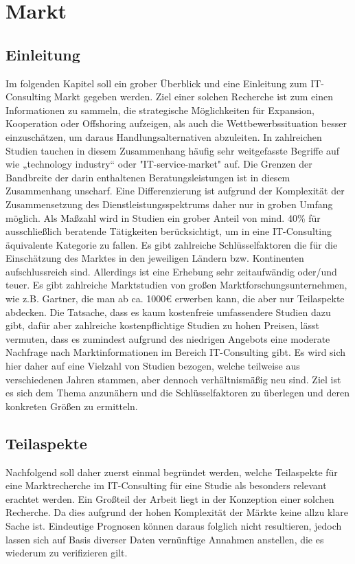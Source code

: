 \section{Markt}
\subsection{Einleitung}
Im folgenden Kapitel soll ein grober Überblick und eine Einleitung zum IT-Consulting Markt gegeben werden. 
Ziel einer solchen Recherche ist zum einen Informationen zu sammeln, die strategische Möglichkeiten für Expansion, Kooperation oder Offshoring aufzeigen, 
als auch die Wettbewerbssituation besser einzuschätzen, um daraus Handlungsalternativen abzuleiten. 
In zahlreichen Studien tauchen in diesem Zusammenhang häufig sehr weitgefasste Begriffe auf wie „technology industry“ oder "IT-service-market" auf. 
Die Grenzen der Bandbreite der darin enthaltenen Beratungsleistungen ist in diesem Zusammenhang unscharf. Eine Differenzierung ist aufgrund der Komplexität der Zusammensetzung des Dienstleistungsspektrums daher nur in groben Umfang möglich.
Als Maßzahl wird in Studien ein grober Anteil von mind. 40\% für ausschließlich beratende Tätigkeiten berücksichtigt, um in eine IT-Consulting äquivalente Kategorie zu fallen.
Es gibt zahlreiche Schlüsselfaktoren die für die Einschätzung des Marktes in den jeweiligen Ländern bzw. Kontinenten aufschlussreich sind. 
Allerdings ist eine Erhebung sehr zeitaufwändig oder/und teuer. Es gibt zahlreiche Marktstudien von großen Marktforschungsunternehmen, wie z.B. Gartner, die man ab ca. 1000€  erwerben kann, die aber nur Teilaspekte abdecken. 
Die Tatsache, dass es kaum kostenfreie umfassendere Studien dazu gibt, dafür aber zahlreiche kostenpflichtige Studien zu hohen Preisen, lässt vermuten, dass es zumindest aufgrund des niedrigen Angebots eine moderate Nachfrage nach Marktinformationen im Bereich IT-Consulting gibt.
 Es wird sich hier daher auf eine Vielzahl von Studien bezogen, welche teilweise aus verschiedenen Jahren stammen, aber dennoch verhältnismäßig neu sind.
 Ziel ist es sich dem Thema anzunähern und die Schlüsselfaktoren zu überlegen und deren konkreten Größen zu ermitteln.

\subsection{Teilaspekte}
Nachfolgend soll daher zuerst einmal begründet werden, welche Teilaspekte für eine Marktrecherche im IT-Consulting für eine Studie als besonders relevant erachtet werden.
Ein Großteil der Arbeit liegt in der Konzeption einer solchen Recherche. Da dies aufgrund der hohen Komplexität der Märkte keine allzu klare Sache ist. Eindeutige Prognosen können daraus folglich nicht resultieren, jedoch lassen sich auf Basis diverser Daten vernünftige Annahmen anstellen, die es wiederum zu verifizieren gilt. 
